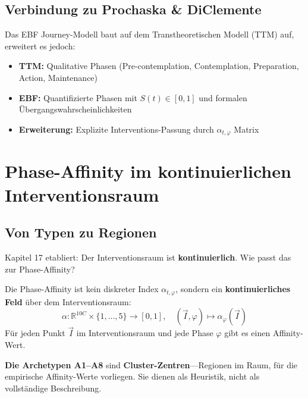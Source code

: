 \subsection{Verbindung zu Prochaska \& DiClemente}

Das EBF Journey-Modell baut auf dem Transtheoretischen Modell (TTM) auf, erweitert es jedoch:

\begin{itemize}
\item \textbf{TTM:} Qualitative Phasen (Pre-contemplation, Contemplation, Preparation, Action, Maintenance)
\item \textbf{EBF:} Quantifizierte Phasen mit $S(t) \in [0,1]$ und formalen Übergangswahrscheinlichkeiten
\item \textbf{Erweiterung:} Explizite Interventions-Passung durch $\alpha_{t,\varphi}$ Matrix
\end{itemize}


\section{Phase-Affinity im kontinuierlichen Interventionsraum}
\label{sec:18-affinity}

\subsection{Von Typen zu Regionen}

Kapitel 17 etabliert: Der Interventionsraum ist \textbf{kontinuierlich}. Wie passt das zur Phase-Affinity?

\begin{tcolorbox}[colback=blue!5!white, colframe=blue!75!black,
    title=\textbf{Schl\"{u}ssel-Einsicht: Affinity als Feld}]
Die Phase-Affinity ist kein diskreter Index $\alpha_{t,\varphi}$, sondern ein \textbf{kontinuierliches Feld} \"{u}ber dem Interventionsraum:
\begin{equation}
\boxed{\alpha: \mathbb{R}^{10C} \times \{1,...,5\} \rightarrow [0,1], \quad (\vec{I}, \varphi) \mapsto \alpha_\varphi(\vec{I})}
\end{equation}
F\"{u}r jeden Punkt $\vec{I}$ im Interventionsraum und jede Phase $\varphi$ gibt es einen Affinity-Wert.
\end{tcolorbox}

\textbf{Die Archetypen A1--A8} sind \textbf{Cluster-Zentren}---Regionen im Raum, f\"{u}r die empirische Affinity-Werte vorliegen. Sie dienen als Heuristik, nicht als vollst\"{a}ndige Beschreibung.


